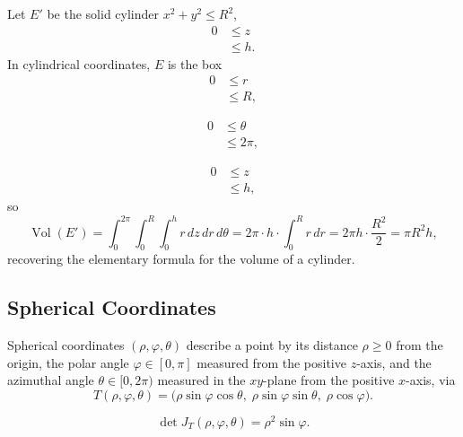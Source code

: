 \begin{example}
Let $E'$ be the solid cylinder $x^2+y^2 \leq R^2$,
\[
\begin{aligned}
0 &\leq z \\
&\leq h.
\end{aligned}
\]
In cylindrical coordinates, $E$ is the box
\[
\begin{aligned}
0 &\leq r \\
&\leq R,
\end{aligned}
\]

\[
\begin{aligned}
0 &\leq \theta \\
&\leq 2\pi,
\end{aligned}
\]

\[
\begin{aligned}
0 &\leq z \\
&\leq h,
\end{aligned}
\]
so
\[
\operatorname{Vol}(E') = \int_0^{2\pi}\int_0^R \int_0^h r\, dz\, dr\, d\theta = 2\pi \cdot h \cdot \int_0^R r\, dr = 2\pi h \cdot \frac{R^2}{2} = \pi R^2 h,
\]
recovering the elementary formula for the volume of a cylinder.
\end{example}

\subsection{Spherical Coordinates}

Spherical coordinates $(\rho,\varphi,\theta)$ describe a point by its distance $\rho \geq 0$ from the origin, the polar angle $\varphi \in [0,\pi]$ measured from the positive $z$-axis, and the azimuthal angle $\theta \in [0,2\pi)$ measured in the $xy$-plane from the positive $x$-axis, via
\[
T(\rho,\varphi,\theta) = \big( \rho\sin\varphi\cos\theta, \; \rho\sin\varphi\sin\theta, \; \rho\cos\varphi \big).
\]

\begin{proposition}

\[
\det J_T(\rho,\varphi,\theta) = \rho^2 \sin\varphi.
\]

\end{proposition}

